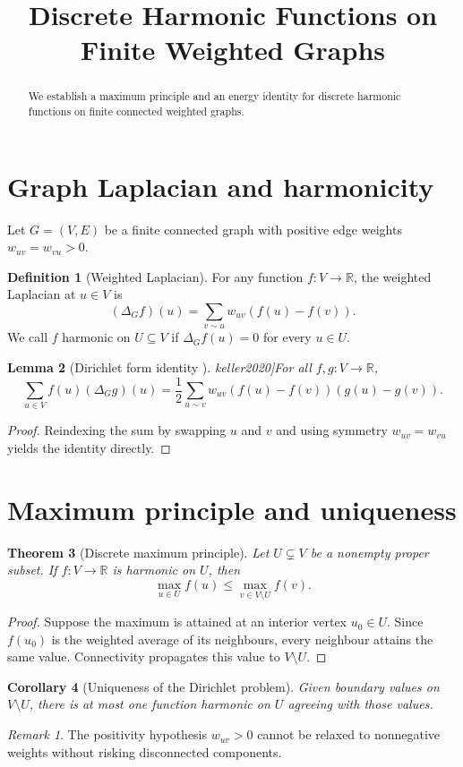 \documentclass[11pt]{article}
\title{Discrete Harmonic Functions on Finite Weighted Graphs}
\newcommand{\R}{\mathbb{R}}
\newcommand{\Lap}[1]{\Delta_{#1}}
\theoremstyle{plain}
\newtheorem{theorem}{Theorem}[section]
\newtheorem{lemma}[theorem]{Lemma}
\newtheorem{corollary}[theorem]{Corollary}
\theoremstyle{definition}
\newtheorem{definition}[theorem]{Definition}
\theoremstyle{remark}
\newtheorem*{remark}{Remark}
\begin{document}
\maketitle
\begin{abstract}
We establish a maximum principle and an energy identity for discrete harmonic functions on finite connected weighted graphs.
\end{abstract}
\section{Graph Laplacian and harmonicity}\label{sec:setup}
Let $G=(V,E)$ be a finite connected graph with positive edge weights $w_{uv}=w_{vu}>0$.
\begin{definition}[Weighted Laplacian]\label{def:lap}
For any function $f:V\to\R$, the weighted Laplacian at $u\in V$ is
\begin{equation}\label{eq:lap}
(\Lap{G} f)(u) = \sum_{v\sim u} w_{uv}(f(u) - f(v)).
\end{equation}
We call $f$ harmonic on $U\subseteq V$ if $\Lap{G} f(u)=0$ for every $u\in U$.
\end{definition}
\begin{lemma}[Dirichlet form identity \cite[Proposition 2.1]{keller2020}]\label{lem:dirichlet}
For all $f,g:V\to\R$,
\[
\sum_{u\in V} f(u)(\Lap{G} g)(u) = \frac{1}{2}\sum_{u\sim v} w_{uv}(f(u)-f(v))(g(u)-g(v)).
\]
\end{lemma}
\begin{proof}
Reindexing the sum by swapping $u$ and $v$ and using symmetry $w_{uv}=w_{vu}$ yields the identity directly.
\end{proof}
\section{Maximum principle and uniqueness}\label{sec:max}
\begin{theorem}[Discrete maximum principle]\label{thm:max}
Let $U\subsetneq V$ be a nonempty proper subset. If $f:V\to\R$ is harmonic on $U$, then
\begin{equation}\label{eq:max-bound}
\max_{u\in U} f(u) \le \max_{v\in V\setminus U} f(v).
\end{equation}
\end{theorem}
\begin{proof}
Suppose the maximum is attained at an interior vertex $u_0\in U$. Since $f(u_0)$ is the weighted average of its neighbours, every neighbour attains the same value. Connectivity propagates this value to $V\setminus U$.
\end{proof}
\begin{corollary}[Uniqueness of the Dirichlet problem]\label{cor:unique}
Given boundary values on $V\setminus U$, there is at most one function harmonic on $U$ agreeing with those values.
\end{corollary}
\begin{remark}
The positivity hypothesis $w_{uv}>0$ cannot be relaxed to nonnegative weights without risking disconnected components.
\end{remark}
\end{document}
